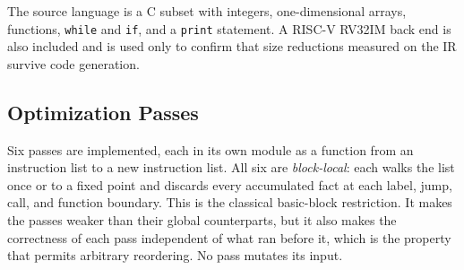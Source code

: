 \documentclass[conference]{IEEEtran}
\begin{document}
The source language is a C subset with integers, one-dimensional arrays, functions, \texttt{while} and \texttt{if}, and a \texttt{print} statement. A RISC-V RV32IM back end is also included and is used only to confirm that size reductions measured on the IR survive code generation.

\subsection{Optimization Passes}
\label{sec:passes}

Six passes are implemented, each in its own module as a function from an instruction list to a new instruction list. All six are \emph{block-local}: each walks the list once or to a fixed point and discards every accumulated fact at each label, jump, call, and function boundary. This is the classical basic-block restriction. It makes the passes weaker than their global counterparts, but it also makes the correctness of each pass independent of what ran before it, which is the property that permits arbitrary reordering. No pass mutates its input.
\end{document}
